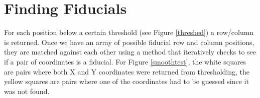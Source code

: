 \documentclass[10pt]{scrartcl}
\begin{document}

\section{Finding Fiducials} %
\label{sec:finding_fiducials}

For each position below a certain threshold (see Figure \ref{threshed}) a row/column  is returned. Once we have an array of possible fiducial row and column positions, they are matched against each other using a method that iteratively checks to see if a pair of coordinates is a fiducial. For Figure \ref{smoothtest}, the white squares are pairs where both X and Y coordinates were returned from thresholding, the yellow squares are pairs where one of the coordinates had to be guessed since it was not found.

   
\end{document}
